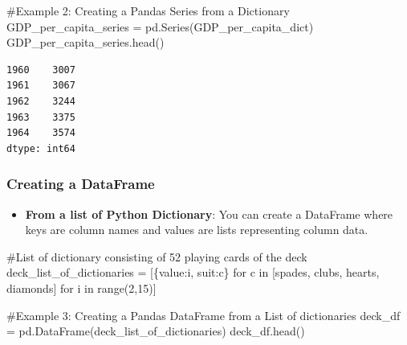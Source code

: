 \documentclass[
  letterpaper,
  DIV=11,
  numbers=noendperiod]{scrreprt}
\newenvironment{Shaded}{\begin{snugshade}}{\end{snugshade}}
\newcommand{\BuiltInTok}[1]{\textcolor[rgb]{0.00,0.23,0.31}{#1}}
\newcommand{\CommentTok}[1]{\textcolor[rgb]{0.37,0.37,0.37}{#1}}
\newcommand{\ControlFlowTok}[1]{\textcolor[rgb]{0.00,0.23,0.31}{#1}}
\newcommand{\DecValTok}[1]{\textcolor[rgb]{0.68,0.00,0.00}{#1}}
\newcommand{\KeywordTok}[1]{\textcolor[rgb]{0.00,0.23,0.31}{#1}}
\newcommand{\NormalTok}[1]{\textcolor[rgb]{0.00,0.23,0.31}{#1}}
\newcommand{\OperatorTok}[1]{\textcolor[rgb]{0.37,0.37,0.37}{#1}}
\newcommand{\StringTok}[1]{\textcolor[rgb]{0.13,0.47,0.30}{#1}}
\providecommand{\tightlist}{%
  \setlength{\itemsep}{0pt}\setlength{\parskip}{0pt}}\usepackage{longtable,booktabs,array}
\begin{document}
\begin{Shaded}
\begin{Highlighting}[]
\CommentTok{\#Example 2: Creating a Pandas Series from a Dictionary}
\NormalTok{GDP\_per\_capita\_series }\OperatorTok{=}\NormalTok{ pd.Series(GDP\_per\_capita\_dict)}
\NormalTok{GDP\_per\_capita\_series.head()}
\end{Highlighting}
\end{Shaded}

\begin{verbatim}
1960    3007
1961    3067
1962    3244
1963    3375
1964    3574
dtype: int64
\end{verbatim}

\hypertarget{creating-a-dataframe}{%
\subsubsection{Creating a DataFrame}\label{creating-a-dataframe}}

\begin{itemize}
\tightlist
\item
  \textbf{From a list of Python Dictionary}: You can create a DataFrame
  where keys are column names and values are lists representing column
  data.
\end{itemize}

\begin{Shaded}
\begin{Highlighting}[]
\CommentTok{\#List of dictionary consisting of 52 playing cards of the deck}
\NormalTok{deck\_list\_of\_dictionaries }\OperatorTok{=}\NormalTok{ [\{}\StringTok{\textquotesingle{}value\textquotesingle{}}\NormalTok{:i, }\StringTok{\textquotesingle{}suit\textquotesingle{}}\NormalTok{:c\}}
\ControlFlowTok{for}\NormalTok{ c }\KeywordTok{in}\NormalTok{ [}\StringTok{\textquotesingle{}spades\textquotesingle{}}\NormalTok{, }\StringTok{\textquotesingle{}clubs\textquotesingle{}}\NormalTok{, }\StringTok{\textquotesingle{}hearts\textquotesingle{}}\NormalTok{, }\StringTok{\textquotesingle{}diamonds\textquotesingle{}}\NormalTok{]}
\ControlFlowTok{for}\NormalTok{ i }\KeywordTok{in} \BuiltInTok{range}\NormalTok{(}\DecValTok{2}\NormalTok{,}\DecValTok{15}\NormalTok{)]}
\end{Highlighting}
\end{Shaded}

\begin{Shaded}
\begin{Highlighting}[]
\CommentTok{\#Example 3: Creating a Pandas DataFrame from a List of dictionaries}
\NormalTok{deck\_df }\OperatorTok{=}\NormalTok{ pd.DataFrame(deck\_list\_of\_dictionaries)}
\NormalTok{deck\_df.head()}
\end{Highlighting}
\end{Shaded}
\end{document}
